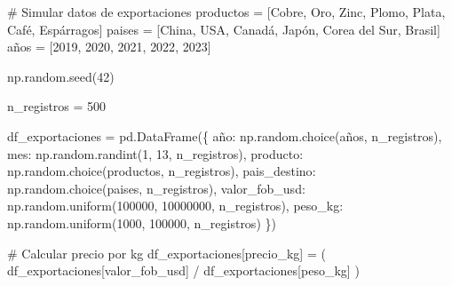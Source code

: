 \documentclass[
  doc,
  floatsintext,
  longtable,
  a4paper,
  nolmodern,
  notxfonts,
  notimes,
  12pt,
  colorlinks=true,linkcolor=blue,citecolor=blue,urlcolor=blue]{apa7}
\newenvironment{Shaded}{\begin{snugshade}}{\end{snugshade}}
\newcommand{\CommentTok}[1]{\textcolor[rgb]{0.37,0.37,0.37}{#1}}
\newcommand{\DecValTok}[1]{\textcolor[rgb]{0.68,0.00,0.00}{#1}}
\newcommand{\NormalTok}[1]{\textcolor[rgb]{0.00,0.23,0.31}{#1}}
\newcommand{\OperatorTok}[1]{\textcolor[rgb]{0.37,0.37,0.37}{#1}}
\newcommand{\StringTok}[1]{\textcolor[rgb]{0.13,0.47,0.30}{#1}}
\begin{document}
\begin{Shaded}
\begin{Highlighting}[]
\CommentTok{\# Simular datos de exportaciones}
\NormalTok{productos }\OperatorTok{=}\NormalTok{ [}\StringTok{\textquotesingle{}Cobre\textquotesingle{}}\NormalTok{, }\StringTok{\textquotesingle{}Oro\textquotesingle{}}\NormalTok{, }\StringTok{\textquotesingle{}Zinc\textquotesingle{}}\NormalTok{, }\StringTok{\textquotesingle{}Plomo\textquotesingle{}}\NormalTok{, }\StringTok{\textquotesingle{}Plata\textquotesingle{}}\NormalTok{, }\StringTok{\textquotesingle{}Café\textquotesingle{}}\NormalTok{, }\StringTok{\textquotesingle{}Espárragos\textquotesingle{}}\NormalTok{]}
\NormalTok{paises }\OperatorTok{=}\NormalTok{ [}\StringTok{\textquotesingle{}China\textquotesingle{}}\NormalTok{, }\StringTok{\textquotesingle{}USA\textquotesingle{}}\NormalTok{, }\StringTok{\textquotesingle{}Canadá\textquotesingle{}}\NormalTok{, }\StringTok{\textquotesingle{}Japón\textquotesingle{}}\NormalTok{, }\StringTok{\textquotesingle{}Corea del Sur\textquotesingle{}}\NormalTok{, }\StringTok{\textquotesingle{}Brasil\textquotesingle{}}\NormalTok{]}
\NormalTok{años }\OperatorTok{=}\NormalTok{ [}\DecValTok{2019}\NormalTok{, }\DecValTok{2020}\NormalTok{, }\DecValTok{2021}\NormalTok{, }\DecValTok{2022}\NormalTok{, }\DecValTok{2023}\NormalTok{]}

\NormalTok{np.random.seed(}\DecValTok{42}\NormalTok{)}

\NormalTok{n\_registros }\OperatorTok{=} \DecValTok{500}

\NormalTok{df\_exportaciones }\OperatorTok{=}\NormalTok{ pd.DataFrame(\{}
    \StringTok{\textquotesingle{}año\textquotesingle{}}\NormalTok{: np.random.choice(años, n\_registros),}
    \StringTok{\textquotesingle{}mes\textquotesingle{}}\NormalTok{: np.random.randint(}\DecValTok{1}\NormalTok{, }\DecValTok{13}\NormalTok{, n\_registros),}
    \StringTok{\textquotesingle{}producto\textquotesingle{}}\NormalTok{: np.random.choice(productos, n\_registros),}
    \StringTok{\textquotesingle{}pais\_destino\textquotesingle{}}\NormalTok{: np.random.choice(paises, n\_registros),}
    \StringTok{\textquotesingle{}valor\_fob\_usd\textquotesingle{}}\NormalTok{: np.random.uniform(}\DecValTok{100000}\NormalTok{, }\DecValTok{10000000}\NormalTok{, n\_registros),}
    \StringTok{\textquotesingle{}peso\_kg\textquotesingle{}}\NormalTok{: np.random.uniform(}\DecValTok{1000}\NormalTok{, }\DecValTok{100000}\NormalTok{, n\_registros)}
\NormalTok{\})}

\CommentTok{\# Calcular precio por kg}
\NormalTok{df\_exportaciones[}\StringTok{\textquotesingle{}precio\_kg\textquotesingle{}}\NormalTok{] }\OperatorTok{=}\NormalTok{ (}
\NormalTok{    df\_exportaciones[}\StringTok{\textquotesingle{}valor\_fob\_usd\textquotesingle{}}\NormalTok{] }\OperatorTok{/}\NormalTok{ df\_exportaciones[}\StringTok{\textquotesingle{}peso\_kg\textquotesingle{}}\NormalTok{]}
\NormalTok{)}


\end{Highlighting}
\end{Shaded}
\end{document}
